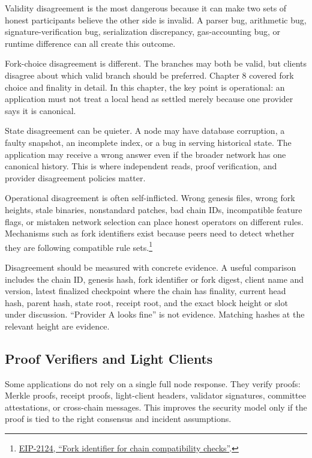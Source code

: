 Validity disagreement is the most dangerous because it can make two sets of honest participants believe the other side is invalid. A parser bug, arithmetic bug, signature-verification bug, serialization discrepancy, gas-accounting bug, or runtime difference can all create this outcome.

Fork-choice disagreement is different. The branches may both be valid, but clients disagree about which valid branch should be preferred. Chapter 8 covered fork choice and finality in detail. In this chapter, the key point is operational: an application must not treat a local head as settled merely because one provider says it is canonical.

State disagreement can be quieter. A node may have database corruption, a faulty snapshot, an incomplete index, or a bug in serving historical state. The application may receive a wrong answer even if the broader network has one canonical history. This is where independent reads, proof verification, and provider disagreement policies matter.

Operational disagreement is often self-inflicted. Wrong genesis files, wrong fork heights, stale binaries, nonstandard patches, bad chain IDs, incompatible feature flags, or mistaken network selection can place honest operators on different rules. Mechanisms such as fork identifiers exist because peers need to detect whether they are following compatible rule sets.\footnote{\href{https://eips.ethereum.org/EIPS/eip-2124}{EIP-2124, ``Fork identifier for chain compatibility checks''}.}

Disagreement should be measured with concrete evidence. A useful comparison includes the chain ID, genesis hash, fork identifier or fork digest, client name and version, latest finalized checkpoint where the chain has finality, current head hash, parent hash, state root, receipt root, and the exact block height or slot under discussion. ``Provider A looks fine'' is not evidence. Matching hashes at the relevant height are evidence.

\subsection{Proof Verifiers and Light Clients}

Some applications do not rely on a single full node response. They verify proofs: Merkle proofs, receipt proofs, light-client headers, validator signatures, committee attestations, or cross-chain messages. This improves the security model only if the proof is tied to the right consensus and incident assumptions.

